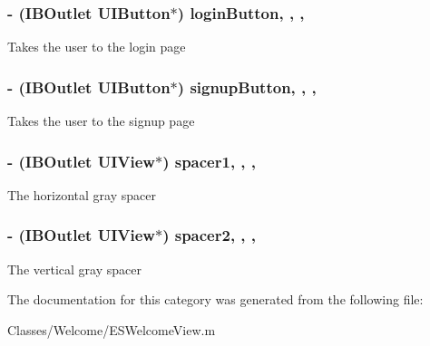 \subsubsection[{login\+Button}]{\setlength{\rightskip}{0pt plus 5cm}-\/ (I\+B\+Outlet U\+I\+Button$\ast$) login\+Button\hspace{0.3cm}{\ttfamily [read]}, {\ttfamily [write]}, {\ttfamily [nonatomic]}, {\ttfamily [strong]}}\label{category_e_s_welcome_view_07_08_ae486c36ac49e2cd1fd98eea73bb0d5df}
Takes the user to the login page \hypertarget{category_e_s_welcome_view_07_08_ac9cc49124302fe4276fc0accb0eedf04}{}
\subsubsection[{signup\+Button}]{\setlength{\rightskip}{0pt plus 5cm}-\/ (I\+B\+Outlet U\+I\+Button$\ast$) signup\+Button\hspace{0.3cm}{\ttfamily [read]}, {\ttfamily [write]}, {\ttfamily [nonatomic]}, {\ttfamily [strong]}}\label{category_e_s_welcome_view_07_08_ac9cc49124302fe4276fc0accb0eedf04}
Takes the user to the signup page \hypertarget{category_e_s_welcome_view_07_08_a53b775e24fc03afd12a561eaa1bb699f}{}
\subsubsection[{spacer1}]{\setlength{\rightskip}{0pt plus 5cm}-\/ (I\+B\+Outlet U\+I\+View$\ast$) spacer1\hspace{0.3cm}{\ttfamily [read]}, {\ttfamily [write]}, {\ttfamily [nonatomic]}, {\ttfamily [strong]}}\label{category_e_s_welcome_view_07_08_a53b775e24fc03afd12a561eaa1bb699f}
The horizontal gray spacer \hypertarget{category_e_s_welcome_view_07_08_af73d29cd2bdc0af2de46ffa4336fcb1d}{}
\subsubsection[{spacer2}]{\setlength{\rightskip}{0pt plus 5cm}-\/ (I\+B\+Outlet U\+I\+View$\ast$) spacer2\hspace{0.3cm}{\ttfamily [read]}, {\ttfamily [write]}, {\ttfamily [nonatomic]}, {\ttfamily [strong]}}\label{category_e_s_welcome_view_07_08_af73d29cd2bdc0af2de46ffa4336fcb1d}
The vertical gray spacer 

The documentation for this category was generated from the following file\+:\begin{DoxyCompactItemize}
\item 
Classes/\+Welcome/E\+S\+Welcome\+View.\+m\end{DoxyCompactItemize}
